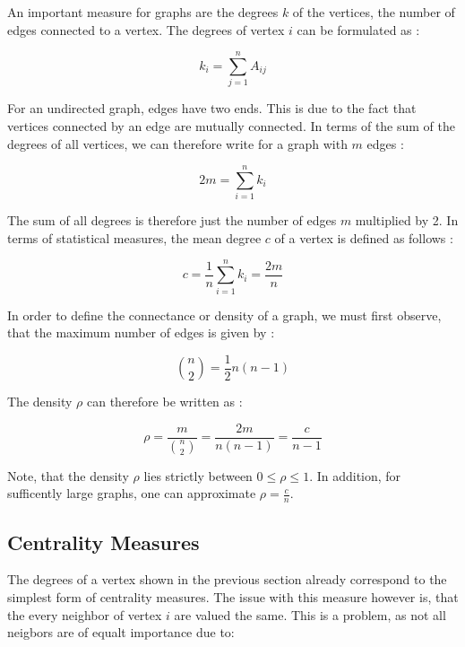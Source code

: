 	An important measure for graphs are the degrees $k$ of the vertices, the 
	number of edges connected to a vertex. The degrees of vertex $i$ can be 
	formulated as \citep[p.133]{Newman2010}:

	\begin{equation}
		k_i = \sum_{j=1}^{n} A_{ij}
	\end{equation}

	\noindent For an undirected graph, edges have two ends. This is due to the 
	fact that vertices connected by an edge are mutually connected. In terms of 
	the sum of the degrees of all vertices, we can therefore write for a graph 
	with $m$ edges \citep[p.133]{Newman2010}:

	\begin{equation}
		2m = \sum_{i=1}^{n} k_i	
	\end{equation}

	\noindent The sum of all degrees is therefore just the number of edges $m$ 
	multiplied by 2. In terms of statistical measures, the mean degree $c$ of a 
	vertex is defined as follows \citep[p.134]{Newman2010}:

	\begin{equation}
		c = \frac{1}{n}\sum_{i=1}^{n}k_i = \frac{2m}{n}
	\end{equation}

	\noindent In order to define the connectance or density of a graph, we must
	first observe, that the maximum number of edges is given by \citep[p.134]{Newman2010}:

	\begin{equation}
		{n \choose 2} = \frac{1}{2}n(n-1)
	\end{equation}

	\noindent The density $\rho$ can therefore be written as \citep[p.134]{Newman2010}:

	\begin{equation}
		\rho = \frac{m}{{n \choose 2}} = \frac{2m}{n(n-1)} = \frac{c}{n-1}
	\end{equation}

	\noindent Note, that the density $\rho$ lies strictly between 
	$0 \leqslant \rho \leqslant 1$. In addition, for sufficently large graphs,
	one can approximate $\rho = \frac{c}{n}$. 

	\subsection{Centrality Measures}

	The degrees of a vertex shown in the previous section already correspond to
	the simplest form of centrality measures. The issue with this measure
	however is, that the every neighbor of vertex $i$ are valued the same. This
	is a problem, as not all neigbors are of equalt importance due to:


